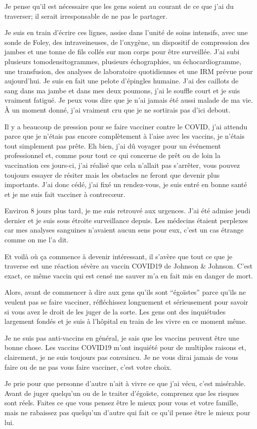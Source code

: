Je pense qu'il est nécessaire que les gens soient au courant de ce que j'ai du
traverser; il serait irresponsable de ne pas le partager.

Je suis en train d'écrire ces lignes, assise dans l'unité de soins intensifs,
avec une sonde de Foley, des intraveineuses, de l'oxygène, un dispositif de
compression des jambes et une tonne de fils collés sur mon corps pour être
surveillée. J'ai subi plusieurs tomodensitogrammes, plusieurs échographies, un
échocardiogramme, une transfusion, des analyses de laboratoire quotidiennes et
une IRM prévue pour aujourd'hui. Je suis en fait une pelote d'épingles
humaine. J'ai des caillots de sang dans ma jambe et dans mes deux poumons, j'ai
le souffle court et je suis vraiment fatigué. Je peux vous dire que je n'ai
jamais été aussi malade de ma vie. À un moment donné, j'ai vraiment cru que je
ne sortirais pas d'ici debout.

Il y a beaucoup de pression pour se faire vacciner contre le COVID, j'ai attendu
parce que je n'étais pas encore complètement à l'aise avec les vaccins, je
n'étais tout simplement pas prête. Eh bien, j'ai dû voyager pour un événement
professionnel et, comme pour tout ce qui concerne de prêt ou de loin la
vaccination ces jours-ci, j'ai réalisé que cela n'allait pas s'arrêter, vous
pouvez toujours essayer de résiter mais les obstacles ne feront que devenir plus
importants. J'ai donc cédé, j'ai fixé un rendez-vous, je suis entré en bonne
santé et je me suis fait vacciner à contrecœur.

Environ 8 jours plus tard, je me suis retrouvé aux urgences. J'ai été admise
jeudi dernier et je suis sous étroite surveillance depuis. Les médecins étaient
perplexes car mes analyses sanguines n'avaient aucun sens pour eux, c'est un cas
étrange comme on me l'a dit.

Et voilà où ça commence à devenir intéressant, il s'avère que tout ce que je
traverse est une réaction sévère au vaccin COVID19 de Johnson \& Johnson. C'est
exact, ce même vaccin qui est censé me sauver m'a en fait mis en danger de mort.

Alors, avant de commencer à dire aux gens qu'ils sont “égoïstes” parce qu'ils ne
veulent pas se faire vacciner, réfléchissez longuement et sérieusement pour
savoir si vous avez le droit de les juger de la sorte. Les gens ont des
inquiétudes largement fondés et je suis à l'hôpital en train de les vivre en ce
moment même.

Je ne suis pas anti-vaccins en général, je sais que les vaccins peuvent être une
bonne chose. Les vaccins COVID19 m'ont inquiété pour de multiples raisons et,
clairement, je ne suis toujours pas convaincu. Je ne vous dirai jamais de vous
faire ou de ne pas vous faire vacciner, c'est votre choix.

Je prie pour que personne d'autre n'ait à vivre ce que j'ai vécu, c'est
misérable. Avant de juger quelqu'un ou de le traiter d'égoïste, comprenez que
les risques sont réels. Faites ce que vous pensez être le mieux pour vous et
votre famille, mais ne rabaissez pas quelqu'un d'autre qui fait ce qu'il pense
être le mieux pour lui.


